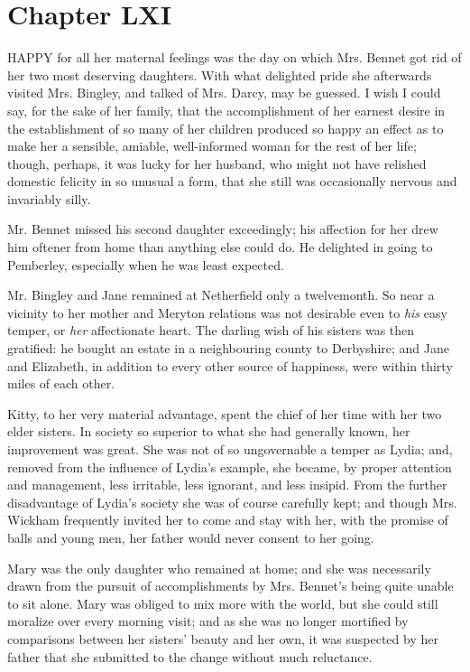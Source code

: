 \documentclass[12pt,openright]{book}
\begin{document}
\chapter{Chapter LXI}

\noindent  HAPPY for all her maternal feelings was the day on which Mrs. Bennet got rid of her two most deserving daughters. With what delighted pride she afterwards visited Mrs. Bingley, and talked of Mrs. Darcy, may be guessed. I wish I could say, for the sake of her family, that the accomplishment of her earnest desire in the establishment of so many of her children produced so happy an effect as to make her a sensible, amiable, well-informed woman for the rest of her life; though, perhaps, it was lucky for her husband, who might not have relished domestic felicity in so unusual a form, that she still was occasionally nervous and invariably silly.

Mr. Bennet missed his second daughter exceedingly; his affection for her drew him oftener from home than anything else could do. He delighted in going to Pemberley, especially when he was least expected.

Mr. Bingley and Jane remained at Netherfield only a twelvemonth. So near a vicinity to her mother and Meryton relations was not desirable even to \textit{his} easy temper, or \textit{her} affectionate heart. The darling wish of his sisters was then gratified: he bought an estate in a neighbouring county to Derbyshire; and Jane and Elizabeth, in addition to every other source of happiness, were within thirty miles of each other.

Kitty, to her very material advantage, spent the chief of her time with her two elder sisters. In society so superior to what she had generally known, her improvement was great. She was not of so ungovernable a temper as Lydia; and, removed from the influence of Lydia’s example, she became, by proper attention and management, less irritable, less ignorant, and less insipid. From the further disadvantage of Lydia’s society she was of course carefully kept; and though Mrs. Wickham frequently invited her to come and stay with her, with the promise of balls and young men, her father would never consent to her going.

Mary was the only daughter who remained at home; and she was necessarily drawn from the pursuit of accomplishments by Mrs. Bennet’s being quite unable to sit alone. Mary was obliged to mix more with the world, but she could still moralize over every morning visit; and as she was no longer mortified by comparisons between her sisters’ beauty and her own, it was suspected by her father that she submitted to the change without much reluctance.
\end{document}

